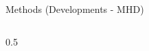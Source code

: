 \begin{frame}{Methods (Developments - MHD)}
\begin{columns}
\begin{column}{0.5\textwidth}
\begin{tcolorbox}
\begin{itemize}
\end{itemize}   


\end{tcolorbox}

\end{column}

\end{columns}

\end{frame}




